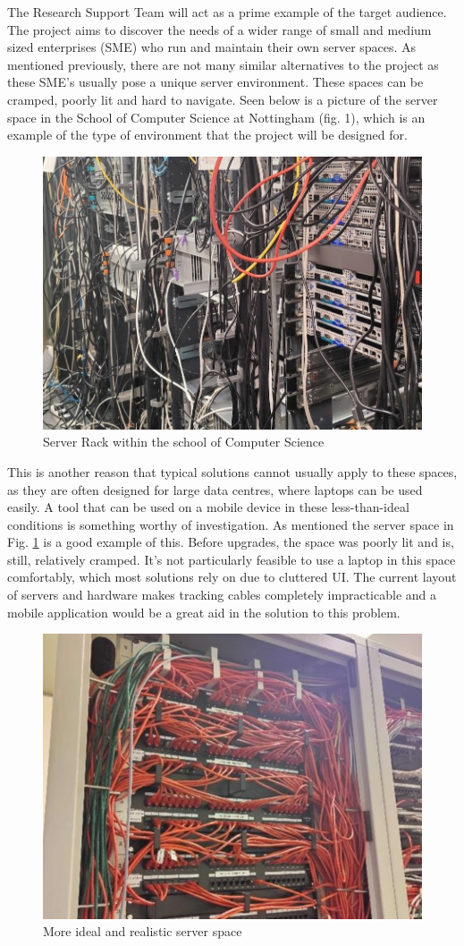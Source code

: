 \documentclass [11pt,a4paper]{article}
\begin{document}
The Research Support Team will act as a prime example of the target audience. The project aims to discover the needs of a wider range of small and medium sized enterprises (SME) who run and maintain their own server spaces. As mentioned previously, there are not many similar alternatives to the project as these SME's usually pose a unique server environment. These spaces can be cramped, poorly lit and hard to navigate. Seen below is a picture of the server space in the School of Computer Science at Nottingham (fig. 1), which is an example of the type of environment that the project will be designed for.
\begin{figure}[H]
    \centering
    \includegraphics[width=0.55\linewidth]{images/server_racks.jpg}
    \caption{Server Rack within the school of Computer Science}
    \label{fig:server_rack}
\end{figure}

This is another reason that typical solutions cannot usually apply to these spaces, as they are often designed for large data centres, where laptops can be used easily. A tool that can be used on a mobile device in these less-than-ideal conditions is something worthy of investigation. As mentioned the server space in Fig. \ref{fig:server_rack} is a good example of this. Before upgrades, the space was poorly lit and is, still, relatively cramped. It’s not particularly feasible to use a laptop in this space comfortably, which most solutions rely on due to cluttered UI. The current layout of servers and hardware makes tracking cables completely impracticable and a mobile application would be a great aid in the solution to this problem. 

\begin{figure}[H]
    \centering
    \includegraphics[width=0.55\linewidth]{images/server_racks_clean.jpg}
    \caption{More ideal and realistic server space}
    \label{fig:ideal_server_space}
\end{figure}
\end{document}
